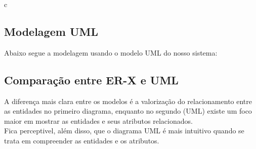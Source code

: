 c\documentclass{article}
\begin{document}
	\subsection{Modelagem UML}
	Abaixo segue a modelagem usando o modelo UML do nosso sistema:\\

	\subsection{Comparação entre ER-X e UML}
	A diferença mais clara entre os modelos é a valorização do relacionamento entre as entidades no primeiro diagrama, enquanto no segundo (UML) existe um foco maior em mostrar as entidades e seus atributos relacionados.\\
	Fica perceptivel, além disso, que o diagrama UML é mais intuitivo quando se trata em compreender as entidades e os atributos.
\end{document}
